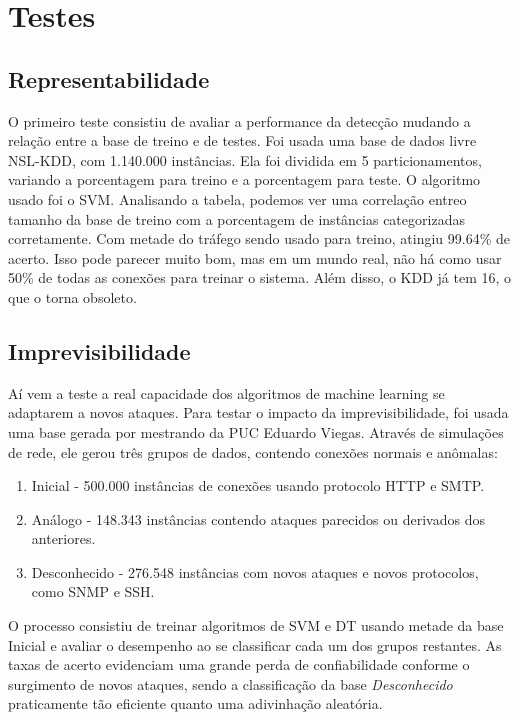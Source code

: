 \documentclass[12pt,a4paper]{article}
\begin{document}
\section{Testes}
    \subsection{Representabilidade}
    O primeiro teste consistiu de avaliar a performance da detecção mudando a relação entre a base de treino e de testes.
    Foi usada uma base de dados livre NSL-KDD, com 1.140.000 instâncias. Ela foi dividida em 5 particionamentos, variando
    a porcentagem para treino e a porcentagem para teste. O algoritmo usado foi o SVM.
    Analisando a tabela, podemos ver uma correlação entreo tamanho da base de treino com a porcentagem de instâncias
    categorizadas corretamente. Com metade do tráfego sendo usado para treino, atingiu 99.64\% de acerto.
    Isso pode parecer muito bom, mas em um mundo real, não há como usar 50\% de todas as conexões para treinar o sistema.
    Além disso, o KDD já tem 16, o que o torna obsoleto.

    \subsection{Imprevisibilidade}
    Aí vem a teste a real capacidade dos algoritmos de machine learning se adaptarem a novos ataques. Para testar o
    impacto da imprevisibilidade, foi usada uma base gerada por mestrando da PUC Eduardo Viegas. Através de simulações de
    rede, ele gerou três grupos de dados, contendo conexões normais e anômalas:
    \begin{enumerate}
        \item Inicial - 500.000 instâncias de conexões usando protocolo HTTP e SMTP.
        \item Análogo - 148.343 instâncias contendo ataques parecidos ou derivados dos anteriores.
        \item Desconhecido - 276.548 instâncias com novos ataques e novos protocolos, como SNMP e SSH.
    \end{enumerate}

    O processo consistiu de treinar algoritmos de SVM e DT usando metade da base Inicial e avaliar o desempenho
     ao se classificar cada um dos grupos restantes. As taxas de acerto evidenciam uma grande perda de confiabilidade
     conforme o surgimento de novos ataques, sendo a classificação da base \textit{Desconhecido} praticamente tão
     eficiente quanto uma adivinhação aleatória.
\end{document}
